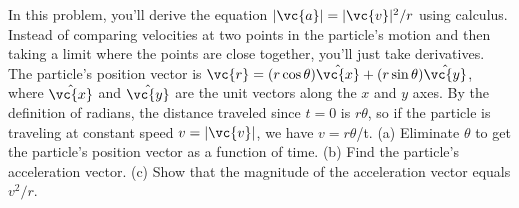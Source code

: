  In this problem, you'll derive the equation
$|\vc{a}|=|\vc{v}|^2/r$ using calculus. Instead of comparing
velocities at two points in the particle's motion and then
taking a limit where the points are close together, you'll
just take derivatives. The particle's position vector is
$\vc{r}=(r \cos\theta)\hat{\vc{x}} + (r\sin\theta)\hat{\vc{y}}$, where $\hat{\vc{x}}$ and $\hat{\vc{y}}$
are the unit vectors along the $x$ and $y$ axes. By the
definition of radians, the distance traveled since $t=0$ is
$r\theta $, so if the particle is traveling at constant
speed $v=|\vc{v}|$, we have $v=r\theta $/t.\hwendpart
 (a) Eliminate $\theta$ to get the particle's position vector as a function of
time.\hwendpart
 (b) Find the particle's acceleration vector.\hwendpart
 (c) Show
that the magnitude of the acceleration vector equals $v^2/r$.
